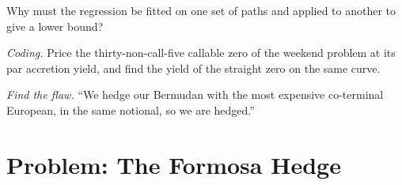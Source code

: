 \begin{exercise}[$\star\star$]\label{exo:rc:bermudans-and-callables:6}
Why must the regression be fitted on one set of paths and applied to another to
give a lower bound?
\end{exercise}

\begin{exercise}[$\star\star\star$]\label{exo:rc:bermudans-and-callables:7}
\emph{Coding.} Price the thirty-non-call-five callable zero of the weekend problem
at its par accretion yield, and find the yield of the straight zero on the same
curve.
\end{exercise}

\begin{exercise}[$\star\star\star$]\label{exo:rc:bermudans-and-callables:8}
\emph{Find the flaw.} ``We hedge our Bermudan with the most expensive co-terminal
European, in the same notional, so we are hedged.''
\end{exercise}

\section{Problem: The Formosa Hedge}

